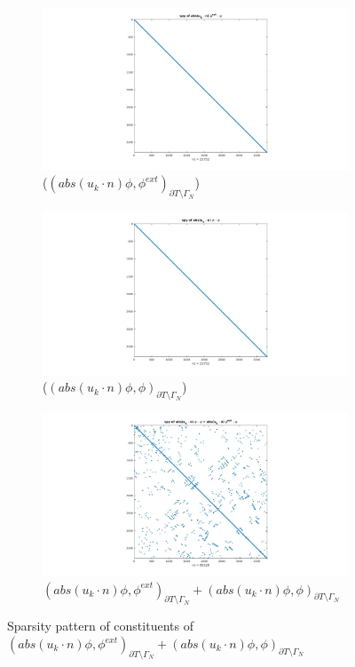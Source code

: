 \documentclass[a4paper,twoside,openright]{book}
\begin{document}
\begin{figure}[H]
\begin{subfigure}{\textwidth}
\centering
  \includegraphics[width=\linewidth]{figure91.jpg}
  \caption{($(abs(u_k \cdot n)\phi,\phi^{ext})_{\partial T \setminus \Gamma_N}$)}
  \label{figure_91}
\end{subfigure}
\begin{subfigure}{\textwidth}	
\centering
  \includegraphics[width=\linewidth]{figure92.jpg}
  \caption{($(abs(u_k \cdot n)\phi,\phi)_{\partial T \setminus \Gamma_N}$)}
  \label{figure_92}
\end{subfigure}
\begin{subfigure}{\textwidth}	
\centering
  \includegraphics[width=\linewidth]{figure9.jpg}
  \caption{$(abs(u_k \cdot n)\phi,\phi^{ext})_{\partial T \setminus \Gamma_N} + (abs(u_k \cdot n)\phi,\phi)_{\partial T \setminus \Gamma_N}$}
  \label{figure_9}
\end{subfigure}
\caption{Sparsity pattern of constituents of $(abs(u_k \cdot n)\phi,\phi^{ext})_{\partial T \setminus \Gamma_N} + (abs(u_k \cdot n)\phi,\phi)_{\partial T \setminus \Gamma_N}$}
\label{figure_9_all}
\end{figure}
\end{document}
